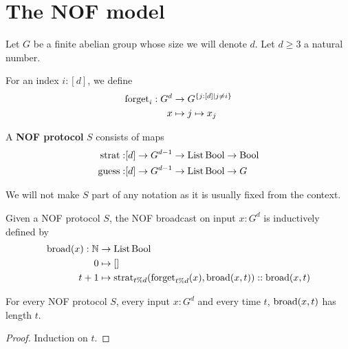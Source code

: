 \chapter{The NOF model}

Let $G$ be a finite abelian group whose size we will denote $d$. Let $d \ge 3$ a natural number.

\begin{definition}
  \label{def:forget}
  \leanok

  For an index $i : [d]$, we define
  \begin{align}
    \operatorname{forget}_i : G^d & \to G^{\{j : [d] \mid j \ne i\}} \\
    x & \mapsto j \mapsto x_j
  \end{align}
\end{definition}

\begin{definition}
  \label{def:protocol}
  \leanok

  A {\bf NOF protocol} $S$ consists of maps
  \begin{align}
    \operatorname{strat} : & [d] \to G^{d - 1} \to \operatorname{List} \operatorname{Bool} \to \operatorname{Bool} \\
    \operatorname{guess} : & [d] \to G^{d - 1} \to \operatorname{List} \operatorname{Bool} \to G
  \end{align}
\end{definition}

We will not make $S$ part of any notation as it is usually fixed from the context.

\begin{definition}
  \label{def:broadcast}
  \leanok

  Given a NOF protocol $S$, the NOF broadcast on input $x : G^d$ is inductively defined by
  \begin{align}
    \operatorname{broad}(x) : \mathbb{N} & \to \operatorname{List} \operatorname{Bool} \\
    0 & \mapsto [] \\
    t + 1 & \mapsto \operatorname{strat}_{t \% d}(\operatorname{forget}_{t \% d}(x), \operatorname{broad}(x, t)) :: \operatorname{broad}(x, t)
  \end{align}
\end{definition}

\begin{lemma}
  \label{lem:length-broadcast}
  \leanok
  For every NOF protocol $S$, every input $x : G^d$ and every time $t$, $\operatorname{broad}(x, t)$ has length $t$.
\end{lemma}
\begin{proof}
  \uses{}
  \leanok
  Induction on $t$.
\end{proof}

